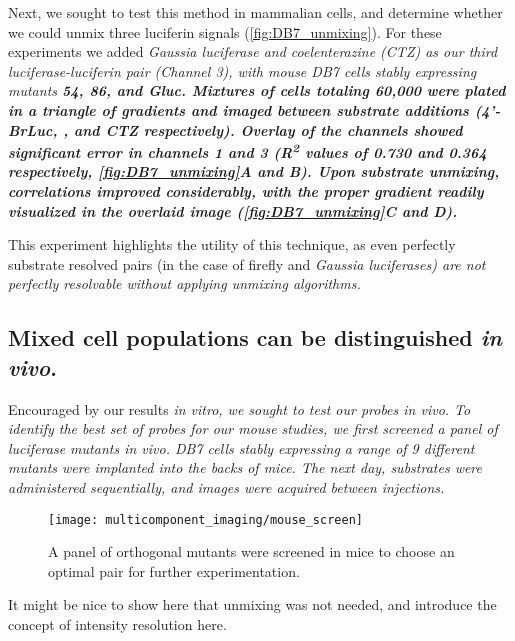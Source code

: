 Next, we sought to test this method in mammalian cells, and determine whether we could unmix three luciferin signals (\autoref{fig:DB7_unmixing}). For these experiments we added \it{Gaussia} luciferase and coelenterazine (CTZ) as our third luciferase-luciferin pair (Channel 3), with mouse DB7 cells stably expressing mutants \bf{54}, \bf{86}, and \bf{Gluc}. Mixtures of cells totaling 60,000 were plated in a triangle of gradients and imaged between substrate additions (\bf{4'-BrLuc}, \dluc{}, and CTZ respectively). Overlay of the channels showed significant error in channels 1 and 3 (R\textsuperscript{2} values of 0.730 and 0.364 respectively, \autoref{fig:DB7_unmixing}A and B). Upon substrate unmixing, correlations improved considerably, with the proper gradient readily visualized in the overlaid image (\autoref{fig:DB7_unmixing}C and D).

This experiment highlights the utility of this technique, as even perfectly substrate resolved pairs (in the case of firefly and \it{Gaussia} luciferases) are not perfectly resolvable without applying unmixing algorithms.

\subsection{Mixed cell populations can be distinguished \textit{in vivo}.}

Encouraged by our results \it{in vitro}, we sought to test our probes \it{in vivo}. To identify the best set of probes for our mouse studies, we first screened a panel of luciferase mutants \it{in vivo}. DB7 cells stably expressing a range of 9 different mutants were implanted into the backs of mice. The next day, substrates were administered sequentially, and images were acquired between injections.

\begin{figure}[htbp]
\texttt{[image: multicomponent\_imaging/mouse\_screen]}
\centering
\caption[Orthogonal mutant screen in mice]{
A panel of orthogonal mutants were screened in mice to choose an optimal pair for further experimentation.
}
  \label{fig:mouse_screen}
\end{figure}

\begin{thoughts}
  It might be nice to show here that unmixing was not needed, and introduce the concept of intensity resolution here.
\end{thoughts}

